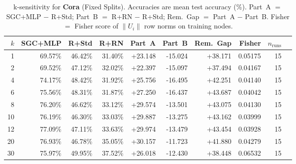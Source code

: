 \begin{table}[t]
\centering\small\setlength{\tabcolsep}{5pt}
\caption{k-sensitivity for \textbf{Cora} (Fixed Splits). Accuracies are mean test accuracy (\%). Part~A $=$ SGC+MLP $-$ R+Std; Part~B $=$ R+RN $-$ R+Std; Rem.~Gap $=$ Part~A $-$ Part~B. Fisher $=$ Fisher score of $\|U_i\|$ row norms on training nodes.}
\label{tab:exp8_per_dataset_cora_fixed}
\begin{tabular}{rrrrrrrrrr}
\toprule
$k$ & SGC+MLP & R+Std & R+RN & Part~A & Part~B & Rem.~Gap & Fisher & $n_{\mathrm{runs}}$ \\
\midrule
1 & 69.57\% & 46.42\% & 31.40\% & +23.148 & -15.024 & +38.171 & 0.05175 & 15 \\
2 & 69.52\% & 47.12\% & 32.02\% & +22.397 & -15.097 & +37.494 & 0.04167 & 15 \\
4 & 74.17\% & 48.42\% & 31.92\% & +25.756 & -16.495 & +42.251 & 0.04140 & 15 \\
6 & 75.56\% & 48.31\% & 31.87\% & +27.250 & -16.437 & +43.687 & 0.04042 & 15 \\
8 & 76.20\% & 46.62\% & 33.12\% & +29.574 & -13.501 & +43.075 & 0.04130 & 15 \\
10 & 76.19\% & 46.30\% & 33.03\% & +29.887 & -13.275 & +43.162 & 0.03999 & 15 \\
12 & 77.09\% & 47.11\% & 33.63\% & +29.974 & -13.479 & +43.454 & 0.03928 & 15 \\
20 & 76.93\% & 46.78\% & 35.05\% & +30.157 & -11.723 & +41.880 & 0.04279 & 15 \\
30 & 75.97\% & 49.95\% & 37.52\% & +26.018 & -12.430 & +38.448 & 0.06532 & 15 \\
\bottomrule
\end{tabular}
\end{table}
